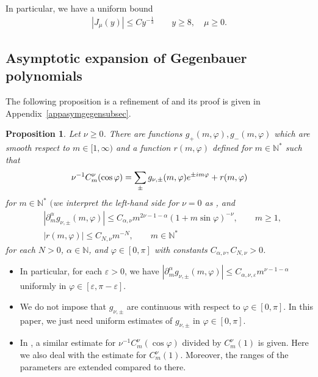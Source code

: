 \documentclass[10pt,a4paper]{article}
\numberwithin{equation}{section}
\newtheorem{Proposition}[Theorem]{Proposition}
 { \theoremstyle{definition}
\newtheorem{Definition}[Theorem]{Definition}
\newtheorem{Note}[Theorem]{Note}
\newtheorem{Example}[Theorem]{Example}
\newtheorem{Remark}[Theorem]{Remark} }
\def\a{\alpha}
\def\e{\varepsilon}
\def\f{\varphi}
\def\m{\mu}
\def\n{\nu}
\def\pa{\partial}
\begin{document}
In particular, we have a uniform bound
\begin{align}\label{Besselunif}
|J_{\m}(y)|\leq Cy^{-\frac{1}{3}}\qquad y\geq 8,\quad \m\geq 0.
\end{align}

\subsection{Asymptotic expansion of Gegenbauer polynomials}

The following proposition is a refinement of \cite[Lemma 10.2]{IJ} and its proof is given in Appendix~\ref{appasymgegensubsec}.

\begin{Proposition}\label{Gegenasymp}
Let $\n\geq 0$.
There are functions $g_{+}(m,\f), g_{-}(m,\f)$ which are smooth respect to $m\in [1,\infty)$ and a function $r(m,\f)$ defined for $m\in\mathbb{N}^*$ such that
\begin{align*}
\n^{-1}C_m^{\n}(\cos\f)=\sum_{\pm}g_{\n,\pm}(m,\f){\rm e}^{\pm {\rm i}m\f}+r(m,\f)
\end{align*}
for $m\in \mathbb{N}^*$ $($we interpret the left-hand side for $\n=0$ as \smash{$\lim_{\n\searrow 0}\n^{-1}C_m^{\n}(\cos \f))$}, and
\begin{align*}
&|\pa_m^{\a}g_{\n,\pm}(m,\f)|\leq
C_{\a,\n}m^{2\n-1-\a}(1+m\sin\f)^{-\n},\qquad m\geq 1,\\
&|r(m,\f)|\leq C_{N,\n}m^{-N},\qquad m\in\mathbb{N}^*
\end{align*}
for each $N>0$, $\a\in\mathbb{N}$, and $\f\in [0,\pi]$ with constants $C_{\a,\n}, C_{N,\n}>0$.
\end{Proposition}

\begin{Remark}\quad
\begin{itemize}\itemsep=0pt
\item[(1)] In particular, for each $\e>0$, we have $|\pa_m^{\a}g_{\n,\pm}(m,\f)|\leq C_{\a,\n,\e}m^{\n-1-\a}$ uniformly in $\f\in [\e,\pi-\e]$.
\item[(2)] We do not impose that $g_{\n,\pm}$ are continuous with respect to $\f\in [0,\pi]$. In this paper, we just need uniform estimates of $g_{\n,\pm}$ in $\f\in [0,\pi]$.
\item[(3)]
In \cite[Lemma 10.2]{IJ}, a similar estimate for $\n^{-1}C_m^{\n}(\cos\f)$ divided by $C_m^{\n}(1)$ is given.
Here we also deal with the estimate for $C_m^{\n}(1)$.
Moreover, the ranges of the parameters are extended compared to there.
\end{itemize}
\end{Remark}
\end{document}
